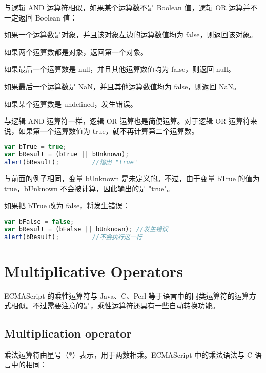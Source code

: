 与逻辑 AND 运算符相似，如果某个运算数不是 Boolean 值，逻辑 OR 运算并不一定返回 Boolean 值：

\begin{compactitem}
\item 如果一个运算数是对象，并且该对象左边的运算数值均为 false，则返回该对象。
\item 如果两个运算数都是对象，返回第一个对象。
\item 如果最后一个运算数是 null，并且其他运算数值均为 false，则返回 null。
\item 如果最后一个运算数是 NaN，并且其他运算数值均为 false，则返回 NaN。
\item 如果某个运算数是 undefined，发生错误。
\end{compactitem}

与逻辑 AND 运算符一样，逻辑 OR 运算也是简便运算。对于逻辑 OR 运算符来说，如果第一个运算数值为 true，就不再计算第二个运算数。

\begin{lstlisting}[language=JavaScript]
var bTrue = true;
var bResult = (bTrue || bUnknown);
alert(bResult);			//输出 "true"
\end{lstlisting}

与前面的例子相同，变量 bUnknown 是未定义的。不过，由于变量 bTrue 的值为 true，bUnknown 不会被计算，因此输出的是 "true"。

如果把 bTrue 改为 false，将发生错误：

\begin{lstlisting}[language=JavaScript]
var bFalse = false;
var bResult = (bFalse || bUnknown);	//发生错误
alert(bResult);			//不会执行这一行
\end{lstlisting}



\chapter{Multiplicative Operators}



ECMAScript 的乘性运算符与 Java、C、Perl 等于语言中的同类运算符的运算方式相似。不过需要注意的是，乘性运算符还具有一些自动转换功能。



\section{Multiplication operator}

乘法运算符由星号（*）表示，用于两数相乘。ECMAScript 中的乘法语法与 C 语言中的相同：


